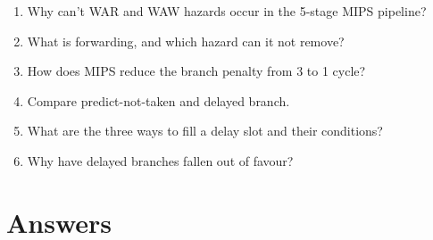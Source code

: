 \documentclass[11pt]{article}
\begin{document}
\begin{enumerate}[label=\textbf{Q\arabic*.},leftmargin=*]
  \item Why can't WAR and WAW hazards occur in the 5-stage MIPS pipeline?
  \item What is forwarding, and which hazard can it not remove?
  \item How does MIPS reduce the branch penalty from 3 to 1 cycle?
  \item Compare predict-not-taken and delayed branch.
  \item What are the three ways to fill a delay slot and their conditions?
  \item Why have delayed branches fallen out of favour?
\end{enumerate}

\section{Answers}
\end{document}
